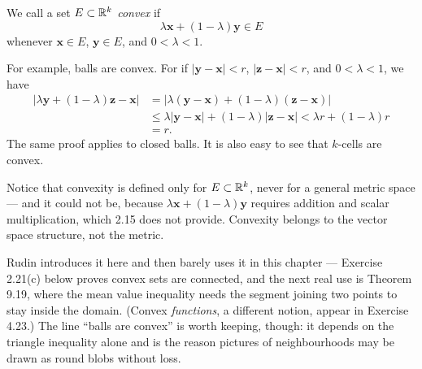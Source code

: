 We call a set $E \subset \mathbb{R}^k$ \emph{convex} if
\[ \lambda\mathbf{x} + (1-\lambda)\mathbf{y} \in E \]
whenever $\mathbf{x} \in E$, $\mathbf{y} \in E$, and $0 < \lambda < 1$.

For example, balls are convex. For if $|\mathbf{y}-\mathbf{x}| < r$,
$|\mathbf{z}-\mathbf{x}| < r$, and $0 < \lambda < 1$, we have
\begin{align*}
  |\lambda\mathbf{y} + (1-\lambda)\mathbf{z} - \mathbf{x}|
    &= |\lambda(\mathbf{y}-\mathbf{x}) + (1-\lambda)(\mathbf{z}-\mathbf{x})|\\
    &\le \lambda|\mathbf{y}-\mathbf{x}| + (1-\lambda)|\mathbf{z}-\mathbf{x}|
       < \lambda r + (1-\lambda)r\\
    &= r.
\end{align*}
The same proof applies to closed balls. It is also easy to see that $k$-cells
are convex.

\begin{deeper}
Notice that convexity is defined only for $E \subset \mathbb{R}^k$, never for a general
metric space --- and it could not be, because
$\lambda\mathbf{x} + (1-\lambda)\mathbf{y}$ requires addition and scalar
multiplication, which 2.15 does not provide. Convexity belongs to the vector
space structure, not the metric.

Rudin introduces it here and then barely uses it in this chapter --- Exercise
2.21(c) below proves convex sets are connected, and the next real use is
Theorem 9.19, where the mean value inequality needs the segment joining two
points to stay inside the domain. (Convex \emph{functions}, a different
notion, appear in Exercise 4.23.) The line ``balls are convex'' is worth
keeping, though: it depends on the triangle inequality alone and is the reason
pictures of neighbourhoods may be drawn as round blobs without loss.

\medskip
\begin{center}
\end{center}
\end{deeper}

